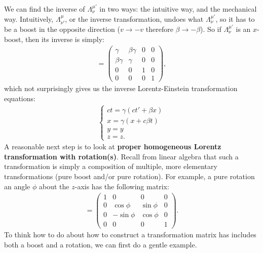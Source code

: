 \documentclass{book}
\theoremstyle{definition}
\begin{document}
We can find the inverse of $\Lambda^{\mu'}_\nu$ in two ways: the intuitive way, and the mechanical way. Intuitively, $\Lambda^{\mu}_{\nu'}$, or the inverse transformation, undoes what $\Lambda^{\mu'}_\nu$, so it has to be a boost in the opposite direction ($v \rightarrow -v$ therefore $\beta \rightarrow -\beta$). So if $\Lambda^{\mu'}_\nu$ is an $x$-boost, then its inverse is simply:
\begin{align*}
[\Lambda^{\mu}_{\nu'}] = 
\begin{pmatrix}
\gamma & \beta\gamma & 0 & 0\\
\beta\gamma & \gamma & 0 & 0\\
0 & 0 & 1 & 0\\
0 & 0 & 0 & 1
\end{pmatrix},
\end{align*}
which not surprisingly gives us the inverse Lorentz-Einstein transformation equations:
\begin{align*}
\begin{cases}
ct= \gamma(ct'+\beta x)\\
x= \gamma(x+c\beta t)\\
y= y\\
z= z.
\end{cases}
\end{align*}
A reasonable next step is to look at \textbf{proper homogeneous Lorentz transformation with rotation(s)}. Recall from linear algebra that such a transformation is simply a composition of multiple, more elementary transformations (pure boost and/or pure rotation). For example, a pure rotation an angle $\phi$ about the $z$-axis has the following matrix:
\begin{align*}
[\Lambda^{\mu'}_\nu] = 
\begin{pmatrix}
1 & 0 & 0 & 0\\
0 & \cos\phi & \sin\phi & 0\\
0 & -\sin\phi & \cos\phi & 0\\
0 & 0 & 0 & 1
\end{pmatrix}.
\end{align*}
To think how to do about how to construct a transformation matrix has includes both a boost and a rotation, we can first do a gentle example.
\end{document}
